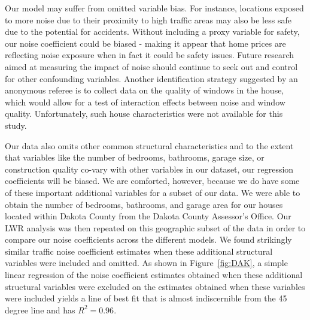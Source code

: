 \documentclass[leqno]{article}\usepackage[]{graphicx}\usepackage[]{color}
\begin{document}
Our model may suffer from omitted variable bias. For instance, locations exposed to more noise due to their proximity to high traffic areas may also be less safe due to the potential for accidents. Without including a proxy variable for safety, our noise coefficient could be biased - making it appear that home prices are reflecting noise exposure when in fact it could be safety issues. Future research aimed at measuring the impact of noise should continue to seek out and control for other confounding variables. Another identification strategy suggested by an anonymous referee is to collect data on the quality of windows in the house, which would allow for a test of interaction effects between noise and window quality. Unfortunately, such house characteristics were not available for this study.

Our data also omits other common structural characteristics and to the extent that variables like the number of bedrooms, bathrooms, garage size, or construction quality co-vary with other variables in our dataset, our regression coefficients will be biased. We are comforted, however, because we do have some of these important additional variables for a subset of our data. We were able to obtain the number of bedrooms, bathrooms, and garage area for our houses located within Dakota County from the Dakota County Assessor's Office. Our LWR analysis was then repeated on this geographic subset of the data in order to compare our noise coefficients across the different models. We found strikingly similar traffic noise coefficient estimates when these additional structural variables were included and omitted. As shown in Figure~\ref{fig:DAK}, a simple linear regression of the noise coefficient estimates obtained when these additional structural variables were excluded on the estimates obtained when these variables were included yields a line of best fit that is almost indiscernible from the 45 degree line and has $R^2 = 0.96$. 
\end{document}
